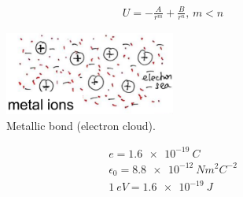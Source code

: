 \documentclass[class=report, crop=false, 12pt,a4paper]{standalone}
\begin{document}
\begin{gather}
	U = -\frac{A}{r^m} + \frac{B}{r^n}, \, m<n
\end{gather}
\begin{figure}[H]
	\centering
	\includegraphics[width = 0.5\textwidth]{../img/figure10.png}
	\caption{Metallic bond (electron cloud).}
\end{figure}
\begin{gather}
	e = \SI{1.6e-19}{C}\\
	\epsilon_0 = \SI{8.8e-12}{Nm^2C^{-2}}\\
	\SI{1}{eV} = \SI{1.6e-19}{J}
\end{gather}
\end{document}
